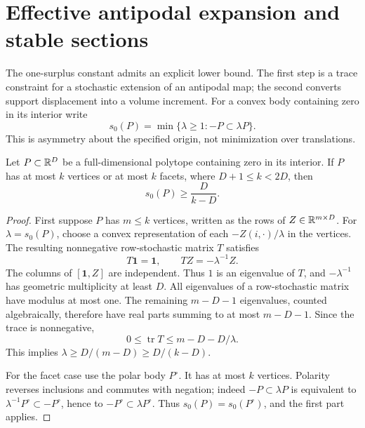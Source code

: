 \section{Effective antipodal expansion and stable sections}
\label{sec:effective52}
The one-surplus constant admits an explicit lower bound. The first
step is a trace constraint for a stochastic extension of an antipodal
map; the second converts support displacement into a volume increment.
For a convex body containing zero in its interior write
\[
 s_0(P)=\min\{\lambda\ge1:-P\subset\lambda P\}.
\]
This is asymmetry about the specified origin, not minimization over
translations.

\begin{lemma}\label{lem:trace52}
Let $P\subset\mathbb R^D$ be a full-dimensional polytope containing zero
in its interior. If $P$ has at most $k$ vertices or at most $k$ facets,
where $D+1\le k<2D$, then
\begin{equation}\label{eq:trace-asymmetry52}
                          s_0(P)\ge\frac{D}{k-D}.
\end{equation}
\end{lemma}
\begin{proof}
First suppose $P$ has $m\le k$ vertices, written as the rows of
$Z\in\mathbb R^{m\times D}$. For $\lambda=s_0(P)$, choose a convex
representation of each $-Z(i,\cdot)/\lambda$ in the vertices.
The resulting nonnegative row-stochastic matrix $T$ satisfies
\[
              T\mathbf1=\mathbf1,\qquad TZ=-\lambda^{-1}Z.
\]
The columns of $[\mathbf1,Z]$ are independent. Thus $1$ is an
eigenvalue of $T$, and $-\lambda^{-1}$ has geometric multiplicity
at least $D$. All eigenvalues of a row-stochastic matrix have modulus
at most one. The remaining $m-D-1$ eigenvalues, counted algebraically,
therefore have real parts summing to at most $m-D-1$. Since the
trace is nonnegative,
\[
           0\le\operatorname{tr}T\le m-D-D/\lambda.
\]
This implies $\lambda\ge D/(m-D)\ge D/(k-D)$.

For the facet case use the polar body $P^\circ$. It has at most
$k$ vertices. Polarity reverses inclusions and commutes with negation;
indeed $-P\subset\lambda P$ is equivalent to
$\lambda^{-1}P^\circ\subset -P^\circ$, hence to
$-P^\circ\subset\lambda P^\circ$. Thus
$s_0(P)=s_0(P^\circ)$, and the first part applies.
\end{proof}

